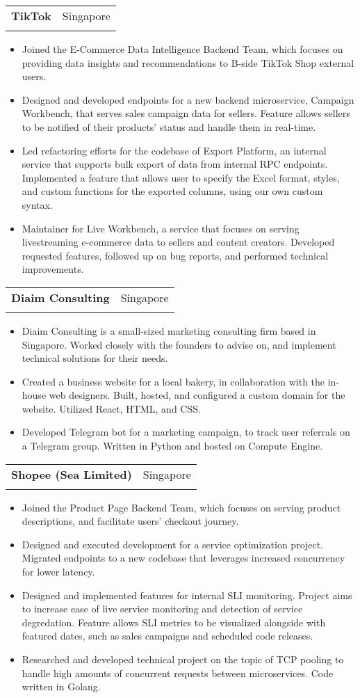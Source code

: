 \documentclass[letterpaper,11pt]{article}
\makeatletter
\newcommand{\resumeItem}[1]{
  \item\small{
    {#1 \vspace{-2pt}}
  }
}
\newcommand{\resumeSubheading}[4]{
  \vspace{-2pt}\item
    \begin{tabular*}{0.97\textwidth}[t]{l@{\extracolsep{\fill}}r}
      \textbf{#1} & #2 \\
      \text{\small#3} & \text{\small #4} \\
    \end{tabular*}\vspace{-7pt}
}
\newcommand{\resumeItemListStart}{\begin{itemize}}
\newcommand{\resumeItemListEnd}{\end{itemize}\vspace{-5pt}}
\makeatother
\begin{document}
    \resumeSubheading
      {TikTok}{Singapore}
      {Software Engineer, Intern}{Jan 2024 | Aug 2024}
        \resumeItemListStart
            \resumeItem{Joined the E-Commerce Data Intelligence Backend Team, which focuses on providing data insights and recommendations to B-side TikTok Shop external users.}
            \resumeItem{Designed and developed endpoints for a new backend microservice, Campaign Workbench, that serves sales campaign data for sellers. Feature allows sellers to be notified of their products' status and handle them in real-time.}
            \resumeItem{Led refactoring efforts for the codebase of Export Platform, an internal service that supports bulk export of data from internal RPC endpoints. Implemented a feature that allows user to specify the Excel format, styles, and custom functions for the exported columns, using our own custom syntax.}
            \resumeItem{Maintainer for Live Workbench, a service that focuses on serving livestreaming e-commerce data to sellers and content creators. Developed requested features, followed up on bug reports, and performed technical improvements.}
        \resumeItemListEnd

    \resumeSubheading
      {Diaim Consulting}{Singapore}
      {Software Engineer, Freelance}{Jun 2023 | Aug 2023}
        \resumeItemListStart
            \resumeItem{Diaim Consulting is a small-sized marketing consulting firm based in Singapore. Worked closely with the founders to advise on, and implement technical solutions for their needs.}
            \resumeItem{Created a business website for a local bakery, in collaboration with the in-house web designers. Built, hosted, and configured a custom domain for the website. Utilized React, HTML, and CSS.}
            \resumeItem{Developed Telegram bot for a marketing campaign, to track user referrals on a Telegram group. Written in Python and hosted on Compute Engine.}
        \resumeItemListEnd

    \resumeSubheading
      {Shopee (Sea Limited)}{Singapore}
      {Software Engineer, Intern}{Feb 2022 | Aug 2022}
        \resumeItemListStart
            \resumeItem{Joined the Product Page Backend Team, which focuses on serving product descriptions, and facilitate users' checkout journey.}
            \resumeItem{Designed and executed development for a service optimization project. Migrated endpoints to a new codebase that leverages increased concurrency for lower latency.}
            \resumeItem{Designed and implemented features for internal SLI monitoring. Project aims to increase ease of live service monitoring and detection of service degredation. Feature allows SLI metrics to be visualized alongside with featured dates, such as sales campaigns and scheduled code releases.}
            \resumeItem{Researched and developed technical project on the topic of TCP pooling to handle high amounts of concurrent requests between microservices. Code written in Golang.}
        \resumeItemListEnd
    
\end{document}
